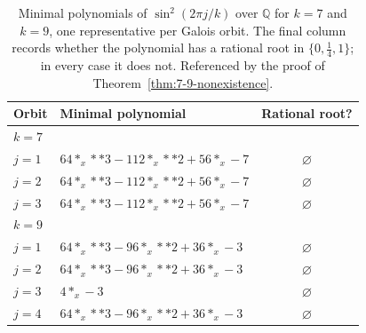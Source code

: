 \begin{table}[htbp]
\centering
\caption{Minimal polynomials of $\sin^2(2\pi j/k)$ over $\mathbb{Q}$
for $k = 7$ and $k = 9$, one representative per Galois orbit. The
final column records whether the polynomial has a rational root in
$\{0, \tfrac{1}{4}, 1\}$; in every case it does not. Referenced by
the proof of Theorem~\ref{thm:7-9-nonexistence}.}
\label{tab:galois-poly}
\begin{tabular}{llc}
\toprule
Orbit & Minimal polynomial & Rational root? \\
\midrule
\multicolumn{3}{l}{\emph{$k = 7$}} \\
$j=1$ & $64*_x**3 - 112*_x**2 + 56*_x - 7$ & $\varnothing$ \\
$j=2$ & $64*_x**3 - 112*_x**2 + 56*_x - 7$ & $\varnothing$ \\
$j=3$ & $64*_x**3 - 112*_x**2 + 56*_x - 7$ & $\varnothing$ \\
\midrule
\multicolumn{3}{l}{\emph{$k = 9$}} \\
$j=1$ & $64*_x**3 - 96*_x**2 + 36*_x - 3$ & $\varnothing$ \\
$j=2$ & $64*_x**3 - 96*_x**2 + 36*_x - 3$ & $\varnothing$ \\
$j=3$ & $4*_x - 3$ & $\varnothing$ \\
$j=4$ & $64*_x**3 - 96*_x**2 + 36*_x - 3$ & $\varnothing$ \\
\bottomrule
\end{tabular}
\end{table}
